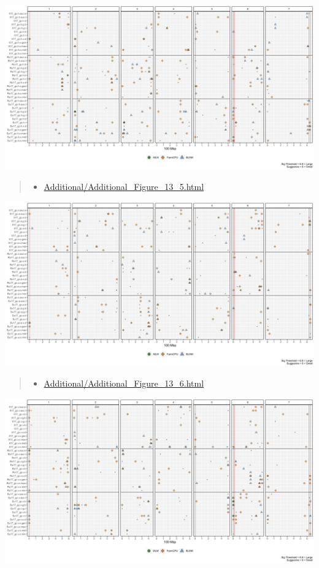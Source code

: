 \documentclass[
]{article}
\providecommand{\tightlist}{%
  \setlength{\itemsep}{0pt}\setlength{\parskip}{0pt}}
\begin{document}
\includegraphics{Additional/Additional_Figure_13_4.png}

\pagebreak

\begin{quote}
\begin{itemize}
\tightlist
\item
  \href{https://derekmichaelwright.github.io/AGILE_LDP_UAV/Additional/Additional_Figure_13_5.html}{Additional/Additional\_Figure\_13\_5.html}
\end{itemize}
\end{quote}

\includegraphics{Additional/Additional_Figure_13_5.png}

\begin{quote}
\begin{itemize}
\tightlist
\item
  \href{https://derekmichaelwright.github.io/AGILE_LDP_UAV/Additional/Additional_Figure_13_6.html}{Additional/Additional\_Figure\_13\_6.html}
\end{itemize}
\end{quote}

\includegraphics{Additional/Additional_Figure_13_6.png}
\end{document}
